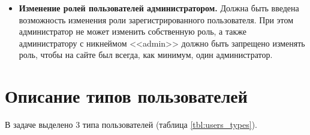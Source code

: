 \begin{itemize}
    \item \textbf{Изменение ролей пользователей администратором.} Должна быть введена возможность изменения роли зарегистрированного пользователя. При этом администратор не может изменить собственную роль, а также администратору с никнеймом <<admin>> должно быть запрещено изменять роль, чтобы на сайте был всегда, как минимум, один администратор.
\end{itemize}


\section{Описание типов пользователей}

В задаче выделено 3 типа пользователей (таблица \ref{tbl:users_types}). 

\captionsetup{justification=raggedleft,singlelinecheck=off}
